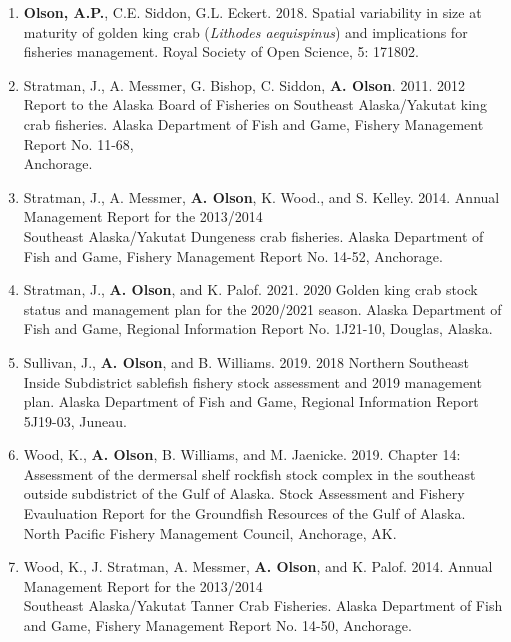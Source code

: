 \documentclass[10pt,a4paper,ragged2e]{altacv}
\begin{document}
\begin{fullwidth}
\begin{enumerate}
\vspace{0.15cm}
\item \textbf{Olson, A.P.}, C.E. Siddon, G.L. Eckert. 2018. Spatial variability in size at maturity of golden king crab (\textit{Lithodes aequispinus}) and implications for fisheries management. Royal Society of Open Science, 5: 171802.
\vspace{0.15cm}
\item Stratman, J., A. Messmer, G. Bishop, C. Siddon, \textbf{A. Olson}. 2011. 2012 Report to the Alaska Board of Fisheries on Southeast Alaska/Yakutat king crab fisheries. Alaska Department of Fish and Game, Fishery Management Report No. 11-68, \\Anchorage.
\vspace{0.15cm}
\item Stratman, J., A. Messmer, \textbf{A. Olson}, K. Wood., and S. Kelley. 2014. Annual Management Report for the 2013/2014 \\Southeast Alaska/Yakutat Dungeness crab fisheries. Alaska Department of Fish and Game, Fishery Management Report No. 14-52, Anchorage.
\vspace{0.15cm}
\item Stratman, J., \textbf{A. Olson}, and K. Palof. 2021. 2020 Golden king crab stock status and management plan for the 2020/2021 season. Alaska Department of Fish and Game, Regional Information Report No. 1J21-10, Douglas, Alaska.
\vspace{0.15cm}
\item Sullivan, J., \textbf{A. Olson}, and B. Williams. 2019. 2018 Northern Southeast Inside Subdistrict sablefish fishery stock assessment and 2019 management plan. Alaska Department of Fish and Game, Regional Information Report 5J19-03, Juneau.
\vspace{0.15cm}
\item Wood, K., \textbf{A. Olson}, B. Williams, and M. Jaenicke. 2019. Chapter 14: Assessment of the dermersal shelf rockfish stock complex in the southeast outside subdistrict of the Gulf of Alaska. Stock Assessment and Fishery Evauluation Report for the Groundfish Resources of the Gulf of Alaska. North Pacific Fishery Management Council, Anchorage, AK.
\vspace{0.15cm}
\item Wood, K., J. Stratman, A. Messmer, \textbf{A. Olson}, and K. Palof. 2014. Annual Management Report for the 2013/2014 \\Southeast Alaska/Yakutat Tanner Crab Fisheries. Alaska Department of Fish and Game, Fishery Management Report No. 14-50, Anchorage.
\end{enumerate}
\end{fullwidth}
\end{document}
